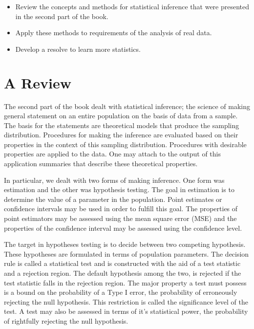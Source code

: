\documentclass[
]{krantz}
\theoremstyle{definition}
\theoremstyle{definition}
\theoremstyle{definition}
\theoremstyle{remark}
\begin{document}
\begin{itemize}
\item
  Review the concepts and methods for statistical inference that were
  presented in the second part of the book.
\item
  Apply these methods to requirements of the analysis of real data.
\item
  Develop a resolve to learn more statistics.
\end{itemize}

\hypertarget{a-review}{%
\section{A Review}\label{a-review}}

The second part of the book dealt with statistical inference; the
science of making general statement on an entire population on the basis
of data from a sample. The basis for the statements are theoretical
models that produce the sampling distribution. Procedures for making the
inference are evaluated based on their properties in the context of this
sampling distribution. Procedures with desirable properties are applied
to the data. One may attach to the output of this application summaries
that describe these theoretical properties.

In particular, we dealt with two forms of making inference. One form was
estimation and the other was hypothesis testing. The goal in estimation
is to determine the value of a parameter in the population. Point
estimates or confidence intervals may be used in order to fulfill this
goal. The properties of point estimators may be assessed using the mean
square error (MSE) and the properties of the confidence interval may be
assessed using the confidence level.

The target in hypotheses testing is to decide between two competing
hypothesis. These hypotheses are formulated in terms of population
parameters. The decision rule is called a statistical test and is
constructed with the aid of a test statistic and a rejection region. The
default hypothesis among the two, is rejected if the test statistic
falls in the rejection region. The major property a test must possess is
a bound on the probability of a Type I error, the probability of
erroneously rejecting the null hypothesis. This restriction is called
the significance level of the test. A test may also be assessed in terms
of it's statistical power, the probability of rightfully rejecting the
null hypothesis.
\end{document}
